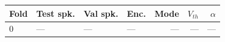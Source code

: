 \begin{tabular}{llllrrr}
\toprule
Fold & Test spk. & Val spk. & Enc. & Mode & $V_{th}$ & $\alpha$ \\
\midrule
0 & --- & --- & --- & --- & --- & --- \\
\bottomrule
\end{tabular}
